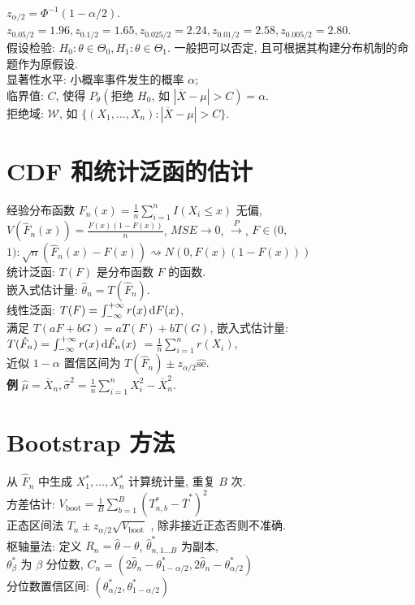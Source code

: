 \documentclass[a4paper, landscape,10pt]{article}
\begin{document}
\begin{multicols}{4}

$z_{\alpha/2} = \Phi^{-1}(1 - \alpha / 2)$. $z_{0.05/2} = 1.96, z_{0.1/2} = 1.65, z_{0.025/2} = 2.24, z_{0.01/2}=2.58, z_{0.005/2}=2.80$. \\
假设检验: $H_0: \theta \in \Theta_0, H_1: \theta \in \Theta_1$. 一般把可以否定, 且可根据其构建分布机制的命题作为原假设. \\
显著性水平: 小概率事件发生的概率 $\alpha$; \\
临界值: $C$, 使得 $P_\theta(\text{拒绝 $H_0$, 如 $|\overline X - \mu| > C$}) = \alpha$.\\
拒绝域: $\mathcal{W}$, 如 $\{ (X_1, \dots, X_n) : |\overline X - \mu| > C\}$.\\
\section{CDF 和统计泛函的估计}
经验分布函数 $F_n(x) = \frac{1}{n} \sum_{i = 1}^n I(X_i \leq x)$
无偏,\\ $V(\hat F_n(x)) = \frac{F(x)(1 - F(x))}{n}$, $MSE \rightarrow 0$, $\xrightarrow{P}$,
$F \in (0,$ $1): \sqrt{n} (\hat F_n(x) - F(x)) \rightsquigarrow N(0, F(x)(1 - F(x)))$\\ 
统计泛函: $T(F)$ 是分布函数 $F$ 的函数. \\
嵌入式估计量: $\hat \theta_n = T(\hat F_n)$. \\
线性泛函: $T(F) = \int_{-\infty}^{+\infty} r(x) \,\mathrm{d} F(x)$, \\
满足 $T(aF + bG) = aT(F) + bT(G)$, 嵌入式估计量: $T(\hat F_n) = \int_{-\infty}^{+\infty} r(x) \,\mathrm{d} \hat F_n(x)$ $= \frac{1}{n} \sum_{i = 1}^n r(X_i)$,\\
近似 $1-\alpha$ 置信区间为 $T(\hat F_n) \pm z_{\alpha/2} \hat {\mathrm{se}}$.\\
{\bfseries 例} $\hat \mu = \overline X_n, \hat \sigma^2 = \frac{1}{n} \sum_{i = 1}^n X_i^2 - \overline X_n^2$. \\
\section{Bootstrap 方法}
从 $\hat F_n$ 中生成 $X_1^*, \dots, X_n^*$ 计算统计量, 重复 $B$ 次. \\
方差估计:  $V_{\mathrm{boot}} = \frac{1}{B} \sum_{b = 1}^B (T_{n,b}^* - \overline T^*)^2$\\
正态区间法 $T_n \pm z_{\alpha/2} \sqrt{V_{\mathrm{boot}}}$ , 除非接近正态否则不准确. \\
枢轴量法: 定义 $R_n = \hat \theta - \theta$, $\hat \theta_{n,1 \dots B }^*$ 为副本, \\
$\theta_\beta^*$ 为 $\beta$ 分位数, $C_n = (2 \hat \theta_n - \theta_{1 -\alpha / 2}^*, 2 \hat \theta_n - \theta_{\alpha / 2}^*)$\\
分位数置信区间: $(\theta_{\alpha/2}^*, \theta_{1 - \alpha/2}^*)$ \\

\end{multicols}
\end{document}
